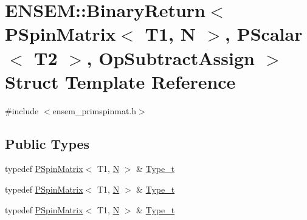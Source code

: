 \hypertarget{structENSEM_1_1BinaryReturn_3_01PSpinMatrix_3_01T1_00_01N_01_4_00_01PScalar_3_01T2_01_4_00_01OpSubtractAssign_01_4}{}\section{E\+N\+S\+EM\+:\+:Binary\+Return$<$ P\+Spin\+Matrix$<$ T1, N $>$, P\+Scalar$<$ T2 $>$, Op\+Subtract\+Assign $>$ Struct Template Reference}
\label{structENSEM_1_1BinaryReturn_3_01PSpinMatrix_3_01T1_00_01N_01_4_00_01PScalar_3_01T2_01_4_00_01OpSubtractAssign_01_4}


{\ttfamily \#include $<$ensem\+\_\+primspinmat.\+h$>$}

\subsection*{Public Types}
\begin{DoxyCompactItemize}
\item 
typedef \mbox{\hyperlink{classENSEM_1_1PSpinMatrix}{P\+Spin\+Matrix}}$<$ T1, \mbox{\hyperlink{adat__devel_2lib_2hadron_2operator__name__util_8cc_a7722c8ecbb62d99aee7ce68b1752f337}{N}} $>$ \& \mbox{\hyperlink{structENSEM_1_1BinaryReturn_3_01PSpinMatrix_3_01T1_00_01N_01_4_00_01PScalar_3_01T2_01_4_00_01OpSubtractAssign_01_4_add7bea3a5ec6001788d9783d5b22348a}{Type\+\_\+t}}
\item 
typedef \mbox{\hyperlink{classENSEM_1_1PSpinMatrix}{P\+Spin\+Matrix}}$<$ T1, \mbox{\hyperlink{adat__devel_2lib_2hadron_2operator__name__util_8cc_a7722c8ecbb62d99aee7ce68b1752f337}{N}} $>$ \& \mbox{\hyperlink{structENSEM_1_1BinaryReturn_3_01PSpinMatrix_3_01T1_00_01N_01_4_00_01PScalar_3_01T2_01_4_00_01OpSubtractAssign_01_4_add7bea3a5ec6001788d9783d5b22348a}{Type\+\_\+t}}
\item 
typedef \mbox{\hyperlink{classENSEM_1_1PSpinMatrix}{P\+Spin\+Matrix}}$<$ T1, \mbox{\hyperlink{adat__devel_2lib_2hadron_2operator__name__util_8cc_a7722c8ecbb62d99aee7ce68b1752f337}{N}} $>$ \& \mbox{\hyperlink{structENSEM_1_1BinaryReturn_3_01PSpinMatrix_3_01T1_00_01N_01_4_00_01PScalar_3_01T2_01_4_00_01OpSubtractAssign_01_4_add7bea3a5ec6001788d9783d5b22348a}{Type\+\_\+t}}
\end{DoxyCompactItemize}


